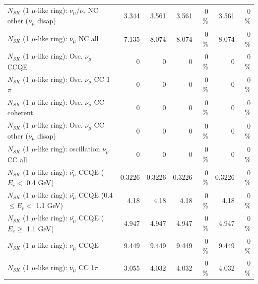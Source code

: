 \begin{table}
\begin{tabular}{| l | r | r | r  r | r  r |}
   $N_{SK}$ (1 $\mu$-like ring): $\nu_\mu$/$\nu_\tau$ NC other ($\nu_\mu$ disap) &           3.344 &           3.561 &           3.561 &        0 \%  &           3.561 &        0 \%  \\ 
                                $N_{SK}$ (1 $\mu$-like ring): $\nu_{\mu}$ NC all &           7.135 &           8.074 &           8.074 &        0 \%  &           8.074 &        0 \%  \\ 
\hline
\hline
                               $N_{SK}$ (1 $\mu$-like ring): Osc. $\nu_\mu$ CCQE &               0 &               0 &               0 &        0 \%  &               0 &        0 \%  \\ 
                          $N_{SK}$ (1 $\mu$-like ring): Osc. $\nu_\mu$ CC 1$\pi$ &               0 &               0 &               0 &        0 \%  &               0 &        0 \%  \\ 
                        $N_{SK}$ (1 $\mu$-like ring): Osc. $\nu_\mu$ CC coherent &               0 &               0 &               0 &        0 \%  &               0 &        0 \%  \\ 
         $N_{SK}$ (1 $\mu$-like ring): Osc. $\nu_\mu$ CC other ($\nu_\mu$ disap) &               0 &               0 &               0 &        0 \%  &               0 &        0 \%  \\ 
                      $N_{SK}$ (1 $\mu$-like ring): oscillation $\nu_\mu$ CC all &               0 &               0 &               0 &        0 \%  &               0 &        0 \%  \\ 
\hline
\hline
          $N_{SK}$ (1 $\mu$-like ring): $\bar{\nu_\mu}$ CCQE ($E_{r} <$ 0.4 GeV) &          0.3226 &          0.3226 &          0.3226 &        0 \%  &          0.3226 &        0 \%  \\ 
 $N_{SK}$ (1 $\mu$-like ring): $\bar{\nu_\mu}$ CCQE (0.4 $\leq E_{r} <$ 1.1 GeV) &            4.18 &            4.18 &            4.18 &        0 \%  &            4.18 &        0 \%  \\ 
       $N_{SK}$ (1 $\mu$-like ring): $\bar{\nu_\mu}$ CCQE ($E_{r} \geq$ 1.1 GeV) &           4.947 &           4.947 &           4.947 &        0 \%  &           4.947 &        0 \%  \\ 
\hline
                              $N_{SK}$ (1 $\mu$-like ring): $\bar{\nu_\mu}$ CCQE &           9.449 &           9.449 &           9.449 &        0 \%  &           9.449 &        0 \%  \\ 
                         $N_{SK}$ (1 $\mu$-like ring): $\bar{\nu_\mu}$ CC 1$\pi$ &           3.055 &           4.032 &           4.032 &        0 \%  &           4.032 &        0 \%  \\ 

\end{tabular}
\end{table}
